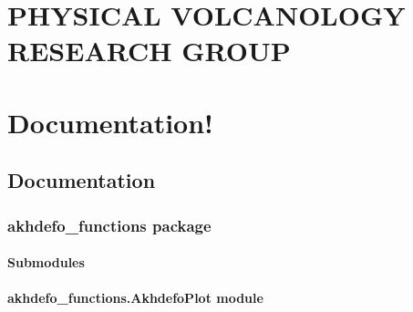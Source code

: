 \documentclass[letterpaper,10pt,english]{sphinxmanual}
\begin{document}
\begin{quote}


\end{quote}

\sphinxstepscope


\chapter{PHYSICAL VOLCANOLOGY RESEARCH GROUP}
\label{\detokenize{aboutUS:physical-volcanology-research-group}}\label{\detokenize{aboutUS::doc}}

\begin{quote}


\end{quote}


\chapter{Documentation!}
\label{\detokenize{index:documentation}}
\sphinxstepscope


\section{Documentation}
\label{\detokenize{modules:documentation}}\label{\detokenize{modules::doc}}
\sphinxstepscope


\subsection{akhdefo\_functions package}
\label{\detokenize{akhdefo_functions:akhdefo-functions-package}}\label{\detokenize{akhdefo_functions::doc}}

\subsubsection{Submodules}
\label{\detokenize{akhdefo_functions:submodules}}

\subsubsection{akhdefo\_functions.AkhdefoPlot module}
\label{\detokenize{akhdefo_functions:module-akhdefo_functions.AkhdefoPlot}}\label{\detokenize{akhdefo_functions:akhdefo-functions-akhdefoplot-module}}
\end{document}
